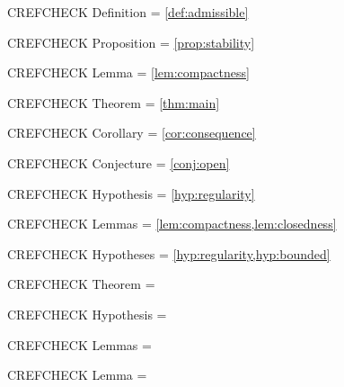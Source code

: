 \documentclass[11pt]{ocots-paper}
\begin{document}
\noindent CREFCHECK Definition = \cref{def:admissible}\par
\noindent CREFCHECK Proposition = \cref{prop:stability}\par
\noindent CREFCHECK Lemma = \cref{lem:compactness}\par
\noindent CREFCHECK Theorem = \cref{thm:main}\par
\noindent CREFCHECK Corollary = \cref{cor:consequence}\par
\noindent CREFCHECK Conjecture = \cref{conj:open}\par
\noindent CREFCHECK Hypothesis = \cref{hyp:regularity}\par
\noindent CREFCHECK Lemmas = \cref{lem:compactness,lem:closedness}\par
\noindent CREFCHECK Hypotheses = \cref{hyp:regularity,hyp:bounded}\par

\noindent CREFCHECK Theorem = \par
\noindent CREFCHECK Hypothesis = \par
\noindent CREFCHECK Lemmas = \par
\noindent CREFCHECK Lemma = \par
\end{document}
